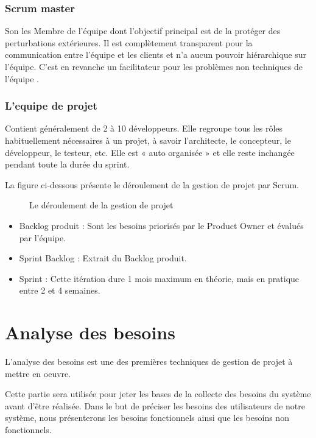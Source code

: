 \subsubsection{Scrum master  }
	Son les Membre de l'équipe dont l'objectif principal est de la protéger des perturbations extérieures. Il est complètement transparent pour la communication entre l'équipe et les clients et n'a aucun pouvoir hiérarchique sur l'équipe. C'est en revanche un facilitateur pour les problèmes non techniques de l'équipe .
\subsubsection{L'equipe de projet  }
	Contient généralement de 2 à 10 développeurs. Elle regroupe tous les rôles habituellement nécessaires à un projet, à savoir l'architecte, le concepteur, le développeur, le testeur, etc. Elle est « auto organisée » et elle reste inchangée pendant toute la durée du sprint.
	
	La figure ci-dessous présente le déroulement de la gestion de projet par Scrum.
	
	\begin{figure} [H]
		\begin{center}
			\centering
		\end{center}
		\caption{Le déroulement de la gestion de projet}
	\end{figure}
	\begin{itemize}
		
		
		\item Backlog produit : Sont les besoins priorisés par le Product Owner et évalués par l'équipe.
		\item Sprint Backlog : Extrait du Backlog produit.
		\item Sprint : Cette itération dure 1 mois maximum en théorie, mais en pratique entre 2 et 4 semaines.
	\end{itemize}
	\section{Analyse des besoins }	
	L'analyse des besoins est une des premières techniques de gestion de projet à mettre en oeuvre.
	
	Cette partie sera utilisée pour jeter les bases de la collecte des besoins du système avant d'être réalisée.
	Dans le but de préciser les besoins des utilisateurs de notre système, nous présenterons les besoins fonctionnels ainsi que les besoins non fonctionnels.
	
